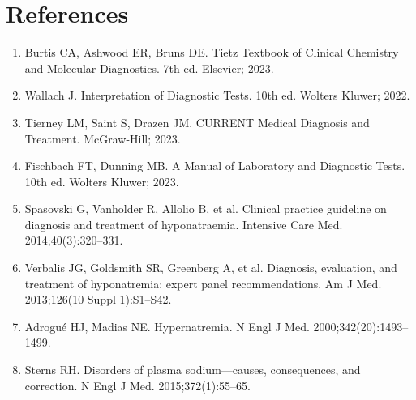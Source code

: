 \section*{References}
\begin{enumerate}
  \item Burtis CA, Ashwood ER, Bruns DE. Tietz Textbook of Clinical Chemistry and Molecular Diagnostics. 7th ed. Elsevier; 2023.
  \item Wallach J. Interpretation of Diagnostic Tests. 10th ed. Wolters Kluwer; 2022.
  \item Tierney LM, Saint S, Drazen JM. CURRENT Medical Diagnosis and Treatment. McGraw-Hill; 2023.
  \item Fischbach FT, Dunning MB. A Manual of Laboratory and Diagnostic Tests. 10th ed. Wolters Kluwer; 2023.
  \item Spasovski G, Vanholder R, Allolio B, et al. Clinical practice guideline on diagnosis and treatment of hyponatraemia. Intensive Care Med. 2014;40(3):320--331.
  \item Verbalis JG, Goldsmith SR, Greenberg A, et al. Diagnosis, evaluation, and treatment of hyponatremia: expert panel recommendations. Am J Med. 2013;126(10 Suppl 1):S1--S42.
  \item Adrogu\'{e} HJ, Madias NE. Hypernatremia. N Engl J Med. 2000;342(20):1493--1499.
  \item Sterns RH. Disorders of plasma sodium---causes, consequences, and correction. N Engl J Med. 2015;372(1):55--65.
\end{enumerate}

\clearpage
